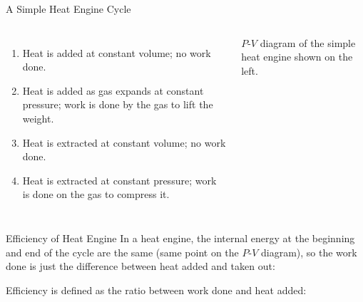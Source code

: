 \documentclass[12pt,aspectratio=169]{beamer}
\begin{document}
\begin{frame}{A Simple Heat Engine Cycle}
  \begin{columns}
    \begin{enumerate}
    \item\vspace{-.15in} Heat is added at constant volume; no work done.
    \item Heat is added as gas expands at constant pressure; work is done by
      the gas to lift the weight.
    \item Heat is extracted at constant volume; no work done.
    \item Heat is extracted at constant pressure; work is done on the gas to
      compress it.
    \end{enumerate}

    {\footnotesize $P$-$V$ diagram of the simple heat engine shown on the left.
      \par}
  \end{columns}
\end{frame}



\begin{frame}{Efficiency of Heat Engine}
  In a heat engine, the internal energy at the beginning and end of the cycle
  are the same (same point on the $P$-$V$ diagram), so the work done is just
  the difference between heat added and taken out:
  
  
  \vspace{-.15in}Efficiency is defined as the ratio between work done and heat
  added:

\end{frame}
\end{document}
